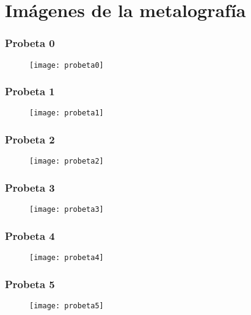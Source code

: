 \documentclass[a4paper,12pt]{report}
\begin{document}
\section{Imágenes de la metalografía}
\subsubsection{Probeta 0}
\begin{figure}[H]
\begin{center}
\texttt{[image: probeta0]}
\end{center}
\end{figure}
\subsubsection{Probeta 1}
\begin{figure}[H]
\begin{center}
\texttt{[image: probeta1]}
\end{center}
\end{figure}
\subsubsection{Probeta 2}
\begin{figure}[H]
\begin{center}
\texttt{[image: probeta2]}
\end{center}
\end{figure}
\subsubsection{Probeta 3}
\begin{figure}[H]
\begin{center}
\texttt{[image: probeta3]}
\end{center}
\end{figure}
\subsubsection{Probeta 4}
\begin{figure}[H]
\begin{center}
\texttt{[image: probeta4]}
\end{center}
\end{figure}
\subsubsection{Probeta 5}
\begin{figure}[H]
\begin{center}
\texttt{[image: probeta5]}
\end{center}
\end{figure}
\end{document}
